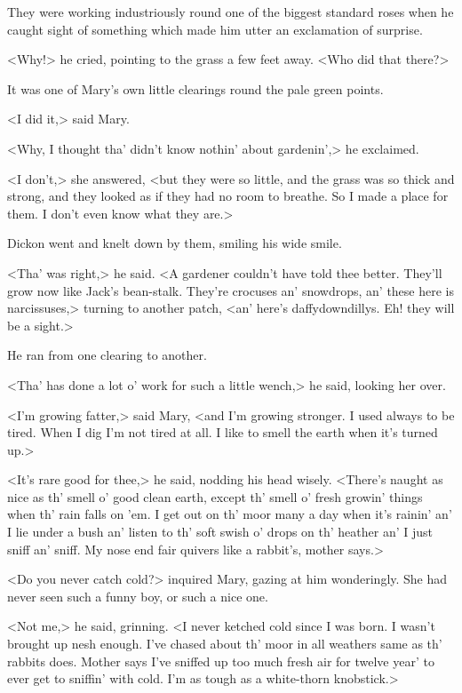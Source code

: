 They were working industriously round one of the biggest standard roses when he caught sight of something which made him utter an exclamation of surprise.

<Why!> he cried, pointing to the grass a few feet away. <Who did that there?>

It was one of Mary's own little clearings round the pale green points.

<I did it,> said Mary.

<Why, I thought tha' didn't know nothin' about gardenin',> he exclaimed.

<I don't,> she answered, <but they were so little, and the grass was so thick and strong, and they looked as if they had no room to breathe. So I made a place for them. I don't even know what they are.>

Dickon went and knelt down by them, smiling his wide smile.

<Tha' was right,> he said. <A gardener couldn't have told thee better. They'll grow now like Jack's bean-stalk. They're crocuses an' snowdrops, an' these here is narcissuses,> turning to another patch, <an' here's daffydowndillys. Eh! they will be a sight.>

He ran from one clearing to another.

<Tha' has done a lot o' work for such a little wench,> he said, looking her over.

<I'm growing fatter,> said Mary, <and I'm growing stronger. I used always to be tired. When I dig I'm not tired at all. I like to smell the earth when it's turned up.>

<It's rare good for thee,> he said, nodding his head wisely. <There's naught as nice as th' smell o' good clean earth, except th' smell o' fresh growin' things when th' rain falls on 'em. I get out on th' moor many a day when it's rainin' an' I lie under a bush an' listen to th' soft swish o' drops on th' heather an' I just sniff an' sniff. My nose end fair quivers like a rabbit's, mother says.>

<Do you never catch cold?> inquired Mary, gazing at him wonderingly. She had never seen such a funny boy, or such a nice one.

<Not me,> he said, grinning. <I never ketched cold since I was born. I wasn't brought up nesh enough. I've chased about th' moor in all weathers same as th' rabbits does. Mother says I've sniffed up too much fresh air for twelve year' to ever get to sniffin' with cold. I'm as tough as a white-thorn knobstick.>

